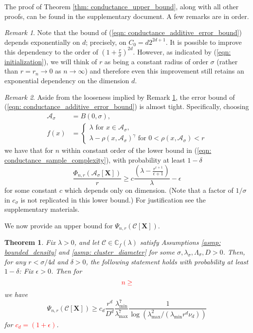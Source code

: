 \documentclass{article}
\newcommand{\1}{\mathbf{1}}
\newcommand{\Xbf}{\mathbf{X}}
\newcommand{\Cbb}{\mathbb{C}}
\newcommand{\Cset}{\mathcal{C}}
\newcommand{\Aset}{\mathcal{A}}
\newcommand{\Asig}{\Aset_{\sigma}}
\theoremstyle{aldenthm}
\newtheorem{theorem}{Theorem}
\theoremstyle{remark}
\newtheorem{remark}{Remark}
\begin{document}
The proof of Theorem \ref{thm: conductance_upper_bound}, along with all other proofs, can be found in the supplementary document. A few remarks are in order. 
\begin{remark}
	\label{rem: exp_in_d}
	Note that the bound of (\ref{eqn: conductance_additive_error_bound}) depends exponentially on $d$; precisely, on $C_0 = d2^{2d +1}$. It is possible to improve this dependency to the order of $(1 + \frac{r}{\sigma})^{2d}$. However, as indicated by (\ref{eqn: initialization}), we will think of $r$ as being a constant radius of order $\sigma$ (rather than $r = r_n \to 0$ as $n \to \infty$) and therefore even this improvement still retains an exponential dependency on the dimension $d$.
\end{remark}
\begin{remark}
	Aside from the looseness implied by Remark \ref{rem: exp_in_d}, the error bound of (\ref{eqn: conductance_additive_error_bound}) is almost tight. Specifically, choosing
	\begin{align*}
	\Asig & = B(0,\sigma), \\
	 f(x) & = 
	 \begin{cases}
	 \lambda \text{ for $x \in \Asig$}, \\
	 \lambda - \rho(x,\Asig)^{\gamma} \text{ for $0 < \rho(x,\Asig) < r$}
	 \end{cases}
	\end{align*}
	we have that for $n$ within constant order of the lower bound in (\ref{eqn: conductance_sample_complexity}), with probability at least $1 - \delta$
	\begin{equation*}
	\frac{\Phi_{n,r}(\Asig[\mathbf{X}])}{r} \geq c \frac{(\lambda - \frac{r^{\epsilon+1}}{\epsilon+1})}{\lambda} - \epsilon
	\end{equation*}
	for some constant $c$ which depends only on dimension. (Note that a factor of $1 / \sigma$ in $c_{\sigma}$ is not replicated in this lower bound.) For justification see the supplementary materials.
\end{remark}

We now provide an upper bound for $\Psi_{n,r}(\Cset[\Xbf])$.
\begin{theorem}
	\label{thm: inverse_mixing_time_lower_bound}
	Fix $\lambda > 0$, and let $\Cset \in \Cbb_f(\lambda)$ satisfy Assumptions \ref{asmp: bounded_density} and \ref{asmp: cluster_diameter} for some $\sigma, \lambda_{\sigma}, \Lambda_{\sigma}, D > 0$. Then, for any $r < \sigma/4d$ and $\delta > 0$, the following statement holds with probability at least $1 - \delta$:  Fix $\epsilon > 0$. Then for
	\begin{equation*}
	\textcolor{red}{n \geq }
	\end{equation*}
	we have
	\begin{equation*}
	\Psi_{n,r}(\Cset[\Xbf]) \geq c_d \frac{r^d}{D^d} \frac{\lambda_{\min}^7}{\lambda_{\max}^7} \frac{1}{\log(\lambda_{\max}^2/(\lambda_{\min} r^d \nu_d))}
	\end{equation*}
	for \textcolor{red}{$c_d = (1 + \epsilon)$}.
\end{theorem}
\end{document}
